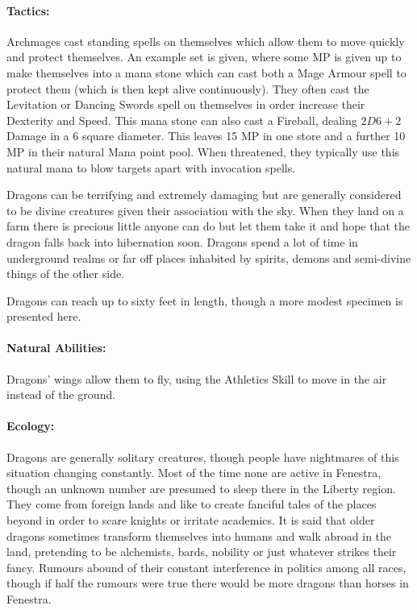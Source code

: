 \begin{multicols}{2}
\paragraph{Tactics:} Archmages cast standing spells on themselves which allow them to move quickly and protect themselves.
An example set is given, where some MP is given up to make themselves into a mana stone which can cast both a Mage Armour spell to protect them (which is then kept alive continuously).
They often cast the Levitation or Dancing Swords spell on themselves in order increase their Dexterity and Speed.
This mana stone can also cast a Fireball, dealing $2D6+2$ Damage in a 6 square diameter.
This leaves 15 MP in one store and a further 10 MP in their natural Mana point pool.
When threatened, they typically use this natural mana to blow targets apart with invocation spells.


\label{dragon}

Dragons can be terrifying and extremely damaging but are generally considered to be divine creatures given their association with the sky.
When they land on a farm there is precious little anyone can do but let them take it and hope that the dragon falls back into hibernation soon.
Dragons spend a lot of time in underground realms or far off places inhabited by spirits, demons and semi-divine things of the other side.

Dragons can reach up to sixty feet in length, though a more modest specimen is presented here.

\paragraph{Natural Abilities:}
Dragons' wings allow them to fly, using the Athletics Skill to move in the air instead of the ground.

\paragraph{Ecology:} Dragons are generally solitary creatures, though people have nightmares of this situation changing constantly.
Most of the time none are active in Fenestra, though an unknown number are presumed to sleep there in the Liberty region.
They come from foreign lands and like to create fanciful tales of the places beyond in order to scare knights or irritate academics.
It is said that older dragons sometimes transform themselves into humans and walk abroad in the land, pretending to be alchemists, bards, nobility or just whatever strikes their fancy.
Rumours abound of their constant interference in politics among all races, though if half the rumours were true there would be more dragons than horses in Fenestra.


\end{multicols}
